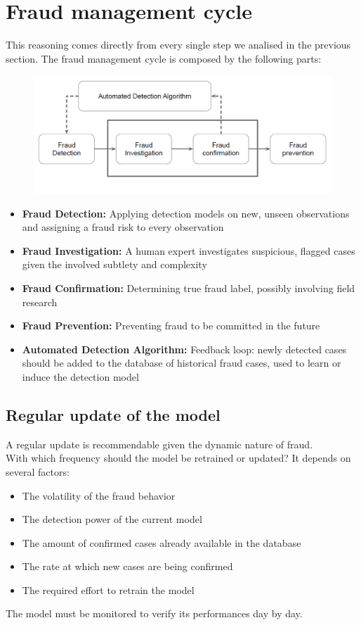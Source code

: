 \section{Fraud management cycle}
    This reasoning comes directly from every single step we analised in the previous section.
    The fraud management cycle is composed by the following parts:
    \begin{figure}[ht!]
        \centering
        \includegraphics[width=0.6\linewidth]{cycle.png}
    \end{figure}
    \begin{itemize}
        \item \textbf{Fraud Detection:} Applying detection models on new, unseen observations and assigning a fraud risk to every observation
        \item \textbf{Fraud Investigation:} A human expert investigates suspicious, flagged cases given the involved subtlety and complexity
        \item \textbf{Fraud Confirmation:} Determining true fraud label, possibly involving field research
        \item \textbf{Fraud Prevention:} Preventing fraud to be committed in the future
        \item \textbf{Automated Detection Algorithm:} Feedback loop: newly detected cases should be added to the database of historical fraud cases, used to learn or induce the detection model
    \end{itemize}
    \subsection{Regular update of the model}
        A regular update is recommendable given the dynamic nature of fraud.\\
        With which frequency should the model be retrained or updated? It depends on several factors:
        \begin{itemize}
            \item The volatility of the fraud behavior
            \item The detection power of the current model
            \item The amount of confirmed cases already available in the database
            \item The rate at which new cases are being confirmed 
            \item The required effort to retrain the model
        \end{itemize}
        The model must be monitored to verify its performances day by day.
